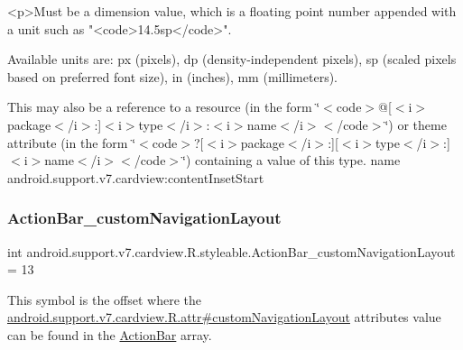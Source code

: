 \begin{DoxyVerb}      <p>Must be a dimension value, which is a floating point number appended with a unit such as "<code>14.5sp</code>".
\end{DoxyVerb}
 Available units are\+: px (pixels), dp (density-\/independent pixels), sp (scaled pixels based on preferred font size), in (inches), mm (millimeters). 

This may also be a reference to a resource (in the form \char`\"{}$<$code$>$@\mbox{[}$<$i$>$package$<$/i$>$\+:\mbox{]}$<$i$>$type$<$/i$>$\+:$<$i$>$name$<$/i$>$$<$/code$>$\char`\"{}) or theme attribute (in the form \char`\"{}$<$code$>$?\mbox{[}$<$i$>$package$<$/i$>$\+:\mbox{]}\mbox{[}$<$i$>$type$<$/i$>$\+:\mbox{]}$<$i$>$name$<$/i$>$$<$/code$>$\char`\"{}) containing a value of this type.  name android.\+support.\+v7.\+cardview\+:content\+Inset\+Start \mbox{\label{classandroid_1_1support_1_1v7_1_1cardview_1_1R_1_1styleable_a93ac940816d8b8b67d888d7020292361}} 
\subsubsection{\texorpdfstring{Action\+Bar\+\_\+custom\+Navigation\+Layout}{ActionBar\_customNavigationLayout}}
{\footnotesize\ttfamily int android.\+support.\+v7.\+cardview.\+R.\+styleable.\+Action\+Bar\+\_\+custom\+Navigation\+Layout = 13\hspace{0.3cm}{\ttfamily [static]}}

This symbol is the offset where the \hyperlink{classandroid_1_1support_1_1v7_1_1cardview_1_1R_1_1attr_aacada8734410b34e167ba3c763dc7be6}{android.\+support.\+v7.\+cardview.\+R.\+attr\#custom\+Navigation\+Layout} attribute\textquotesingle{}s value can be found in the \hyperlink{classandroid_1_1support_1_1v7_1_1cardview_1_1R_1_1styleable_a0cbf7f776e31f78bb0a2b558daf176f8}{Action\+Bar} array.

